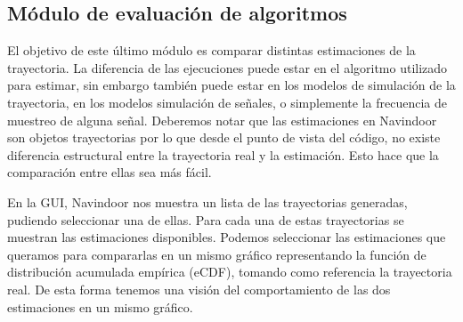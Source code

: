 

\subsection{Módulo de evaluación de algoritmos}

El objetivo de este último módulo es comparar distintas estimaciones de la trayectoria. La diferencia de las ejecuciones puede estar en el algoritmo utilizado para estimar, sin embargo también puede estar en los modelos de simulación de la trayectoria, en los modelos simulación de señales, o simplemente la frecuencia de muestreo de alguna señal. Deberemos notar que las estimaciones en Navindoor son objetos trayectorias por lo que desde el punto de vista del código, no existe diferencia estructural entre la trayectoria real y la estimación. Esto hace que la comparación entre ellas sea más fácil.

En la GUI, Navindoor nos muestra un lista de las trayectorias generadas, pudiendo seleccionar una de ellas. Para cada una de estas trayectorias se muestran las estimaciones disponibles. Podemos seleccionar las estimaciones que queramos para compararlas en un mismo gráfico representando la función de distribución acumulada empírica (eCDF), tomando como referencia la trayectoria real. De esta forma tenemos una visión del comportamiento de las dos estimaciones en un mismo gráfico.